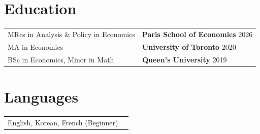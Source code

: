 \documentclass[a4paper,12pt]{article}
\begin{document}
\section{Education}
\begin{tabularx}{\linewidth}{@{}l X@{}} 
MRes in Analysis \& Policy in Economics & \textbf{Paris School of Economics} \hfill 2026 \\

MA in Economics & \textbf{University of Toronto} \hfill 2020 \\ 

BSc in Economics, Minor in Math & \textbf{Queen's University} \hfill 2019 \\
\end{tabularx}

\section{Languages}
\begin{tabularx}{\linewidth}{@{}l X@{}}
\normalsize{English, Korean, French (Beginner)}\\

\end{tabularx}

\vfill
{}
\end{document}
